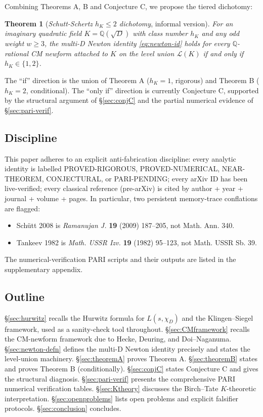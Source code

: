 \documentclass[11pt,a4paper]{amsart}
\newtheorem{theorem}{Theorem}[section]
\theoremstyle{definition}
\newcommand{\Q}{\mathbb{Q}}
\newcommand{\Lcal}{\mathcal{L}}
\newcommand{\hK}{h_{K}}
\begin{document}
Combining Theorems A, B and Conjecture C, we propose the tiered dichotomy:

\begin{theorem}[\emph{Schutt-Schertz $h_K \le 2$ dichotomy}, informal version]\label{thm:dichotomy-informal}
For an imaginary quadratic field $K = \Q(\sqrt{D})$ with class number $\hK$ and any odd weight $w \ge 3$, the multi-D Newton identity \eqref{eq:newton-id} holds for every $\Q$-rational CM newform attached to $K$ on the level union $\Lcal(K)$ if and only if $\hK \in \{1,2\}$.
\end{theorem}

The ``if'' direction is the union of Theorem A ($\hK = 1$, rigorous) and Theorem B ($\hK = 2$, conditional). The ``only if'' direction is currently Conjecture C, supported by the structural argument of \S\ref{sec:conjC} and the partial numerical evidence of \S\ref{sec:pari-verif}.

\subsection{Discipline}\label{sec:discipline}

This paper adheres to an explicit anti-fabrication discipline: every analytic identity is labelled PROVED-RIGOROUS, PROVED-NUMERICAL, NEAR-THEOREM, CONJECTURAL, or PARI-PENDING; every arXiv ID has been live-verified; every classical reference (pre-arXiv) is cited by author + year + journal + volume + pages. In particular, two persistent memory-trace conflations are flagged:
\begin{itemize}[leftmargin=2em]
  \item Sch\"utt 2008 is \emph{Ramanujan J.} \textbf{19} (2009) 187--205, not Math. Ann. 340.
  \item Tankeev 1982 is \emph{Math. USSR Izv.} \textbf{19} (1982) 95--123, not Math. USSR Sb. 39.
\end{itemize}

The numerical-verification PARI scripts and their outputs are listed in the supplementary appendix.

\subsection{Outline}\label{sec:outline}

\S\ref{sec:hurwitz} recalls the Hurwitz formula for $L(s,\chi_D)$ and the Klingen--Siegel framework, used as a sanity-check tool throughout. \S\ref{sec:CMframework} recalls the CM-newform framework due to Hecke, Deuring, and Doi--Naganuma. \S\ref{sec:newton-defn} defines the multi-D Newton identity precisely and states the level-union machinery. \S\ref{sec:theoremA} proves Theorem A. \S\ref{sec:theoremB} states and proves Theorem B (conditionally). \S\ref{sec:conjC} states Conjecture C and gives the structural diagnosis. \S\ref{sec:pari-verif} presents the comprehensive PARI numerical verification tables. \S\ref{sec:Ktheory} discusses the Birch--Tate $K$-theoretic interpretation. \S\ref{sec:openproblems} lists open problems and explicit falsifier protocols. \S\ref{sec:conclusion} concludes.
\end{document}
